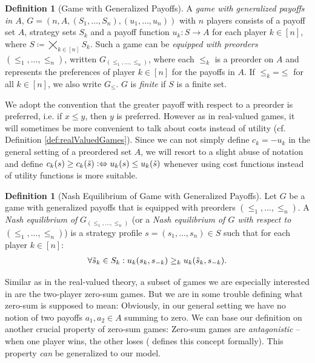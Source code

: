 \documentclass[a4paper]{scrreprt}
\theoremstyle{definition}
\newtheorem{defn}[thm]{Definition} %
\begin{document}
    \begin{defn}[Game with Generalized Payoffs]
        A \emph{game with generalized payoffs in $A$}, $G = (n, A, (S_1, \dots, S_n), (u_1, \dots, u_n))$ with $n$ players consists of a payoff set $A$, strategy sets $S_k$ and a payoff function $u_k: S \to A$ for each player $k \in [n]$, where $S \coloneqq \bigtimes_{k \in [n]} S_k$.        
        Such a game can be \emph{equipped with preorders} $(\leq_1, \dots, \leq_n)$, written $G_{(\leq_1, \dots, \leq_n)}$, where each $\leq_k$ is a preorder on $A$ and represents the preferences of player $k \in [n]$ for the payoffs in $A$.
        If $\leq_k \mathbin{=} \leq$ for all $k \in [n]$, we also write $G_\leq$.
        $G$ is \emph{finite} if $S$ is a finite set.
    \end{defn}
    We adopt the convention that the greater payoff with respect to a preorder is preferred, i.e. if $x \leq y$, then $y$ is preferred. However as in real-valued games, it will sometimes be more convenient to talk about costs instead of utility (cf. Definition \ref{def:realValuedGames}). Since we can not simply define $c_k = -u_k$ in the general setting of a preordered set $A$, we will resort to a slight abuse of notation and define $c_k(s) \geq c_k(\tilde{s}) \mathrel{\vcentcolon\Leftrightarrow} u_k(s) \leq u_k(\tilde{s})$ whenever using cost functions instead of utility functions is more suitable.
    
    \begin{defn}[Nash Equilibrium of Game with Generalized Payoffs]
        Let $G$ be a game with generalized payoffs that is equipped with preorders $(\leq_1, \dots, \leq_n)$.
        A \emph{Nash equilibrium of} $G_{(\leq_1, \dots, \leq_n)}$ (or a \emph{Nash equilibrium of $G$ with respect to $(\leq_1, \dots, \leq_n)$})
        is a strategy profile $s = (s_1, \dots, s_n) \in S$ such that for each player $k \in [n]$:
        \begin{gather}
            \forall \tilde{s}_k \in S_k: u_k(s_k, s_{-k}) \geq_k u_k(\tilde{s}_k, s_{-k}).
            \label{eq:nashEquilibriumGeneralizedPayoffs}
        \end{gather}
    \end{defn}
    
    Similar as in the real-valued theory, a subset of games we are especially interested in are the two-player zero-sum games.
    But we are in some trouble defining what zero-sum is supposed to mean: Obviously, in our general setting we have no notion of two payoffs $a_1, a_2 \in A$ summing to zero.
    We can base our definition on another crucial property of zero-sum games: Zero-sum games are \emph{antagonistic} -- when one player wins, the other loses (\cite{bib:andersonAntagonisticGames} defines this concept formally). This property \emph{can} be generalized to our model.
    
\end{document}
